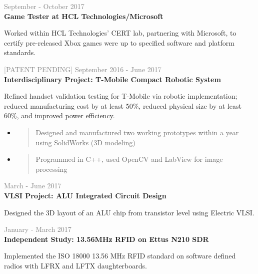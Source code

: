 \documentclass[letterpage]{article}
\begin{document}
\begin{minipage}[t]{0.63\linewidth}
\vspace{7px}
\textcolor{gray}{September - October 2017}\\
\textbf{\textsf{Game Tester at HCL Technologies/Microsoft}}\\
\raggedright
Worked within HCL Technologies' CERT lab, partnering with
Microsoft, to certify pre-released Xbox games were
up to specified software and platform standards.

\vspace{7px}
\textcolor{gray}{
  {\small[PATENT PENDING]\enspace}
  September 2016 - June 2017}\\
\textbf{\textsf{Interdisciplinary Project:
		T-Mobile Compact Robotic System}}\\
\raggedright
Refined handset validation testing for T-Mobile via robotic
implementation;\\reduced manufacturing cost by at least 50\%,
reduced physical size by at least 60\%, and improved
power efficiency.\\
\begin{itemize}[leftmargin=*,labelindent=1mm,labelsep=0mm]
\item
  \begin{quote}
  \raggedright
  Designed and manufactured two working prototypes within
  a year using SolidWorks (3D modeling)
  \end{quote}
\item
  \begin{quote}
  \raggedright
  Programmed in C++,
  used OpenCV and LabView for image processing
  \end{quote}
\end{itemize}

\vspace{7px}
\textcolor{gray}{March - June 2017}\\
\textbf{\textsf{VLSI Project: ALU Integrated Circuit Design}}\\
\raggedright
Designed the 3D layout of an ALU chip from transistor level
using Electric VLSI.

\vspace{7px}
\textcolor{gray}{January - March 2017}\\
\textbf{\textsf{Independent Study: 13.56MHz RFID on Ettus N210 SDR}}\\
\raggedright
Implemented the ISO 18000 13.56 MHz RFID standard on software defined
radios with LFRX and LFTX daughterboards.


\end{minipage}
\end{document}
